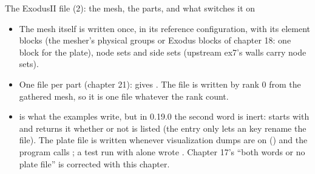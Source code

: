 \documentclass[aspectratio=169,11pt]{beamer}
\begin{document}
\begin{frame}{The ExodusII file (2): the mesh, the parts, and what switches it on}
\label{fr:exodus2}
\footnotesize
\begin{itemize}
  \item The mesh itself is written once, in its reference configuration, with its element blocks (the mesher's physical groups or Exodus blocks of chapter 18: one block  for the plate), node sets and side sets (upstream ex7's walls carry node sets).
  \item One file per part (chapter 21):  gives . The file is written by rank 0 from the gathered mesh, so it is one file whatever the rank count.
  \item {} is what the examples write, but in 0.19.0 the second word is inert:  starts with  and  returns it whether or not  is listed (the entry only lets an  key rename the file). The plate file is written whenever visualization dumps are on () and the program calls ; a test run with  alone wrote . Chapter 17's ``both words or no plate file'' is corrected with this chapter.
\end{itemize}
\end{frame}
\end{document}
